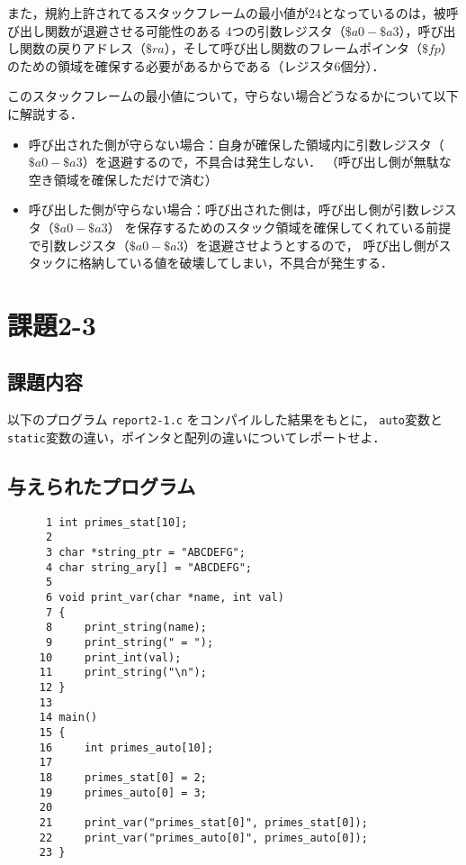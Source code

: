 \documentclass[a4j,11pt]{jarticle}
\begin{document}
また，規約上許されてるスタックフレームの最小値が$24$となっているのは，被呼び出し関数が退避させる可能性のある
4つの引数レジスタ（$\$a0-\$a3$），呼び出し関数の戻りアドレス（$\$ra$），そして呼び出し関数のフレームポインタ（$\$fp$）
のための領域を確保する必要があるからである（レジスタ6個分）．

このスタックフレームの最小値について，守らない場合どうなるかについて以下に解説する．
\begin{itemize}
      \item 呼び出された側が守らない場合：自身が確保した領域内に引数レジスタ（$\$a0-\$a3$）を退避するので，不具合は発生しない．
      （呼び出し側が無駄な空き領域を確保しただけで済む）
      \item 呼び出した側が守らない場合：呼び出された側は，呼び出し側が引数レジスタ（$\$a0-\$a3$）
      を保存するためのスタック領域を確保してくれている前提で引数レジスタ（$\$a0-\$a3$）を退避させようとするので，
      呼び出し側がスタックに格納している値を破壊してしまい，不具合が発生する．
\end{itemize}

\section{課題2-3}
\subsection{課題内容}
以下のプログラム {\tt report2-1.c} をコンパイルした結果をもとに， {\tt auto}変数と{\tt static}変数の違い，ポインタと配列の違いについてレポートせよ．

\subsection{与えられたプログラム}
\begin{verbatim}
      1	int primes_stat[10];
      2	
      3	char *string_ptr = "ABCDEFG";
      4	char string_ary[] = "ABCDEFG";
      5	
      6	void print_var(char *name, int val)
      7	{
      8	    print_string(name);
      9	    print_string(" = ");
     10	    print_int(val);
     11	    print_string("\n");
     12	}
     13	
     14	main()
     15	{
     16	    int primes_auto[10];
     17	
     18	    primes_stat[0] = 2;
     19	    primes_auto[0] = 3;
     20	
     21	    print_var("primes_stat[0]", primes_stat[0]);
     22	    print_var("primes_auto[0]", primes_auto[0]);
     23	}
\end{verbatim}
\end{document}
